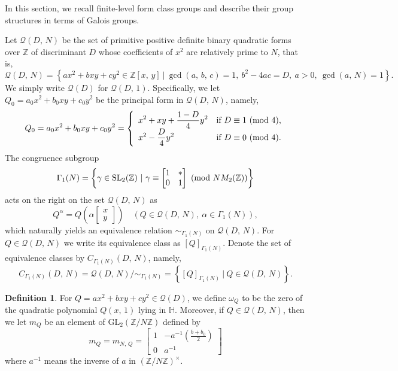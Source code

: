 \documentclass[reqno,11pt]{article}
\newcommand{\Mod}[1]{\ (\textup{mod}\ #1)}
\theoremstyle{plain} %
\theoremstyle{definition} %
\newtheorem{definition}[theorem]{\indent\sc Definition}
\begin{document}
In this section, we recall finite-level form class groups
and describe their group structures in terms of Galois groups.
\par
Let $\mathcal{Q}(D,\,N)$ be the
set of primitive positive definite binary quadratic forms over $\mathbb{Z}$ 
of discriminant $D$ whose coefficients of $x^2$ are relatively prime to $N$, that is,
\begin{equation*}
\mathcal{Q}(D,\,N)=\left\{ax^2+bxy+cy^2\in
\mathbb{Z}[x,\,y]~|~\gcd(a,\,b,\,c)=1,~b^2-4ac=D,~a>0,~\gcd(a,\,N)=1\right\}. 
\end{equation*}
We simply write $\mathcal{Q}(D)$ for 
$\mathcal{Q}(D,\,1)$. 
Specifically, we let
$Q_0=a_0x^2+b_0xy+c_0y^2$ be
the principal form in $\mathcal{Q}(D,\,N)$, namely,
\begin{equation*}
Q_0=a_0x^2+b_0xy+c_0y^2=\left\{\begin{array}{ll}
\displaystyle x^2+xy+\frac{1-D}{4}y^2& \text{if}~D\equiv1\Mod{4},\\
\displaystyle x^2-\frac{D}{4}y^2 & \text{if}~D\equiv0\Mod{4}. 
\end{array}\right.
\end{equation*}
The congruence subgroup
\begin{equation*}
\Gamma_1(N)=\left\{\gamma\in\mathrm{SL}_2(\mathbb{Z})~|~
\gamma\equiv\begin{bmatrix}1& \mathrm{*}\\0&1\end{bmatrix}\Mod{NM_2(\mathbb{Z})}\right\}
\end{equation*}
acts on the right
on the set $\mathcal{Q}(D,\,N)$ as
\begin{equation*}
Q^\alpha=Q\left(\alpha\begin{bmatrix}x\\y\end{bmatrix}\right)
\quad(Q\in\mathcal{Q}(D,\,N),~\alpha\in\Gamma_1(N)),
\end{equation*} 
which naturally yields an equivalence relation $\sim_{\Gamma_1(N)}$ on $\mathcal{Q}(D,\,N)$.
For $Q\in\mathcal{Q}(D,\,N)$ we write
its equivalence class as $[Q]_{\Gamma_1(N)}$.  
Denote the set of equivalence classes by $C_{\Gamma_1(N)}(D,\,N)$, namely,
\begin{equation*}
C_{\Gamma_1(N)}(D,\,N)=\mathcal{Q}(D,\,N)/\sim_{\Gamma_1(N)}
=\left\{[Q]_{\Gamma_1(N)}~|~Q\in\mathcal{Q}(D,\,N)\right\}.
\end{equation*}

\begin{definition}
For $Q=ax^2+bxy+cy^2\in\mathcal{Q}(D)$, we define
$\omega_Q$ to be the zero of the quadratic polynomial $Q(x,\,1)$
lying in $\mathbb{H}$. Moreover, if $Q\in\mathcal{Q}(D,\,N)$, then we let $m_{Q}$
be an element of $\mathrm{GL}_2(\mathbb{Z}/N\mathbb{Z})$ defined by 
\begin{equation*}
m_Q=m_{N,\,Q}=
\begin{bmatrix}1& -a^{-1}\left(\frac{b+b_0}{2}\right)\\
0&a^{-1}\end{bmatrix}
\end{equation*}
where $a^{-1}$ means the inverse of $a$ in $(\mathbb{Z}/N\mathbb{Z})^\times$.
\end{definition}
\end{document}
